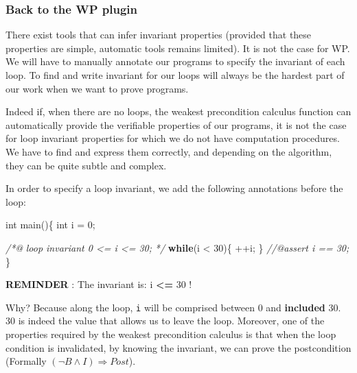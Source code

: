 \documentclass[12pt,francais,]{scrbook}
\newenvironment{Shaded}{}{}
\newcommand{\KeywordTok}[1]{\textcolor[rgb]{0.00,0.44,0.13}{\textbf{{#1}}}}
\newcommand{\DataTypeTok}[1]{\textcolor[rgb]{0.56,0.13,0.00}{{#1}}}
\newcommand{\DecValTok}[1]{\textcolor[rgb]{0.25,0.63,0.44}{{#1}}}
\newcommand{\CommentTok}[1]{\textcolor[rgb]{0.38,0.63,0.69}{\textit{{#1}}}}
\newcommand{\NormalTok}[1]{{#1}}
\newenvironment{zdsalertblock}[1]{%
  \tcolorbox[beamer,%
    noparskip,breakable,
    colback=LightCoral,colframe=DarkRed,%
    colbacklower=Tomato,%
    title=#1]
}{\endtcolorbox}
\begin{document}
\subsubsection{Back to the WP plugin}\label{back-to-the-wp-plugin}

There exist tools that can infer invariant properties (provided that
these properties are simple, automatic tools remains limited). It is not
the case for WP. We will have to manually annotate our programs to
specify the invariant of each loop. To find and write invariant for our
loops will always be the hardest part of our work when we want to prove
programs.

Indeed if, when there are no loops, the weakest precondition calculus
function can automatically provide the verifiable properties of our
programs, it is not the case for loop invariant properties for which we
do not have computation procedures. We have to find and express them
correctly, and depending on the algorithm, they can be quite subtle and
complex.

In order to specify a loop invariant, we add the following annotations
before the loop:

\begin{footnotesize}\begin{Shaded}
\begin{Highlighting}[]
\DataTypeTok{int} \NormalTok{main()\{}
  \DataTypeTok{int} \NormalTok{i = }\DecValTok{0}\NormalTok{;}
  
  \CommentTok{/*@}
\CommentTok{    loop invariant 0 <= i <= 30;}
\CommentTok{  */}
  \KeywordTok{while}\NormalTok{(i < }\DecValTok{30}\NormalTok{)\{}
    \NormalTok{++i;}
  \NormalTok{\}}
  \CommentTok{//@assert i == 30;}
\NormalTok{\}}
\end{Highlighting}
\end{Shaded}\end{footnotesize}

\begin{zdsalertblock}{Warning}
  \textbf{REMINDER} : The invariant is: i \textbf{\textless{}=} 30 !
\end{zdsalertblock}
  
Why? Because along the loop, \texttt{i} will be comprised between 0 and
\textbf{included} 30. 30 is indeed the value that allows us to leave the
loop. Moreover, one of the properties required by the weakest
precondition calculus is that when the loop condition is invalidated, by
knowing the invariant, we can prove the postcondition (Formally
\((\neg B \wedge I) \Rightarrow Post\)).
\end{document}
